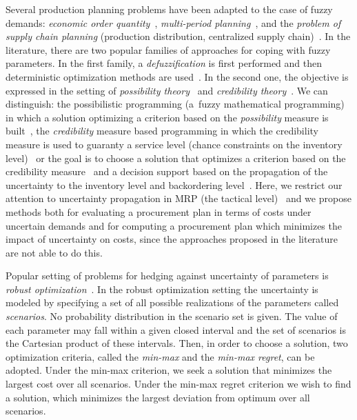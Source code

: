 \documentclass[11pt]{article}
\begin{document}
Several
production planning problems have been adapted  to the case of fuzzy demands:
\emph{economic order quantity}~\cite{KH02,PKMM08}, 
\emph{multi-period planning}~\cite{HT00,GLRV05,GTG10,SY08,YLS09,MPG07,MPP10,TRGZ07}, and the \emph{problem of supply chain planning}
(production distribution, centralized supply chain)~\cite{AFGA07,LC09,PMPV09,PMJB10,PRP99,WS05}.
 In the literature, 
 there are two popular
 families of approaches  for coping with fuzzy parameters.
 In the first family,  a \emph{defuzzification} is first performed 
 and then deterministic optimization methods are used~\cite{PMPV09,PMJB10}.
 In the second one,
the objective is expressed in the setting of 
\emph{possibility theory}~\cite{DP88}  and \emph{credibility theory}~\cite{L04}.
We can distinguish: the possibilistic programming  (a~fuzzy mathematical programming) in which
a solution optimizing
 a criterion
 based on the \emph{possibility} 
  measure is built~\cite{MPP10,TRGZ07},
  the \emph{credibility} measure based programming in which
   the credibility measure is used to guaranty a service level 
   (chance constraints on the inventory level)~\cite{LLS09} or
  the goal is to choose a solution that optimizes a criterion
 based on the credibility measure~\cite{SY08}
 and  a decision support based on the propagation of the uncertainty to the inventory level and backordering level~\cite{HT00,GLRV05,GTG10}.
 Here, we restrict our attention to uncertainty propagation 
 in MRP (the tactical level)~\cite{HT00,GLRV05,GTG10} 
 and we propose methods both for  evaluating a procurement
plan in terms of costs under uncertain demands and for computing 
a procurement plan
 which minimizes
the impact of uncertainty on costs,
since
the approaches proposed in the literature 
are not able to do  this.
 
 
      
Popular 
setting of problems for hedging against 
uncertainty  of parameters is \emph{robust optimization}~\cite{KY97}.
In the robust optimization setting the uncertainty is modeled by specifying a
set of all possible realizations of the parameters called \emph{scenarios}. No probability distribution in the scenario set is given. 
The value of each parameter may fall within a given closed
interval and the set of scenarios is the Cartesian product of
these intervals.
Then, in order to choose a solution,
two optimization criteria,
called the \emph{min-max} and  the \emph{min-max regret}, can be
adopted. 
Under the min-max criterion, we seek a solution that minimizes 
the largest cost over all scenarios. Under the min-max regret criterion we wish to find a solution, which minimizes the largest deviation from optimum over all scenarios.
\end{document}
